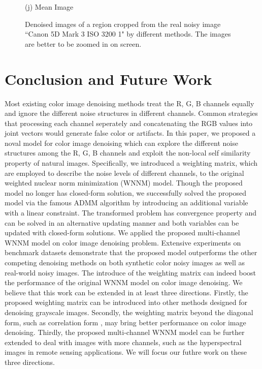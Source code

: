\documentclass[10pt,twocolumn,letterpaper,sort&compress]{article}
\begin{document}
\begin{figure}
{\begin{minipage}[t]{0.195\textwidth}
{\footnotesize (j) Mean Image \cite{crosschannel2016}}
\end{minipage}
}\vspace{-0.5mm}
\caption{Denoised images of a region cropped from the real noisy image ``Canon 5D Mark 3 ISO 3200 1" \cite{crosschannel2016} by different methods. The images are better to be zoomed in on screen.}
\label{fig7}
\vspace{0.5mm}
\end{figure}

\section{Conclusion and Future Work}
Most existing color image denoising methods treat the R, G, B channels equally and ignore the different noise structures in different channels. Common strategies that processing each channel seperately and concatenating the RGB values into joint vectors would generate false color or artifacts. In this paper, we proposed a noval model for color image denoising which can explore the different noise structures among the R, G, B channels and exploit the non-local self similarity property of natural images. Specifically, we introduced a weighting matrix, which are employed to describe the noise levels of different channels, to the original weighted nuclear norm minimization (WNNM) model. Though the proposed model no longer has closed-form solution, we successfully solved the proposed model via the famous ADMM algorithm by introducing an additional variable with a linear constraint. The transformed problem has convergence property and can be solved in an alternative updating manner and both variables can be updated with closed-form solutions. We applied the proposed multi-channel WNNM model on color image denoising problem. Extensive experiments on benchmark datasets demonstrate that the proposed model outperforms the other competing denoising methods on both synthetic color noisy images as well as real-world noisy images. The introduce of the weighting matrix can indeed boost the performance of the original WNNM model on color image denoising. We believe that this work can be extended in at least three directions. Firstly, the proposed weighting matrix can be introduced into other methods designed for denoising grayscale images. Secondly, the weighting matrix beyond the diagonal form, such as correlation form \cite{nearcor}, may bring better performance on color image denoising. Thirdly, the proposed multi-channel WNNM model can be further extended to deal with images with more channels, such as the hyperspectral images in remote sensing applications. We will focus our futhre work on these three directions.



{
\small


}
\end{document}
